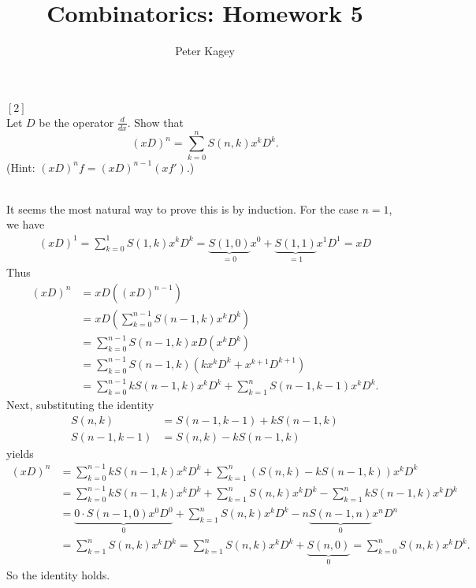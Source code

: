 \documentclass{article}
\newenvironment{problem}[2][Problem]{\begin{trivlist}
\item[\hskip \labelsep {\bfseries #1}\hskip \labelsep {\bfseries #2.}]}{\end{trivlist}}
\newenvironment{solution}[1][Solution.]{\begin{trivlist}
\item[\hskip \labelsep {\bfseries #1}]}{\end{trivlist}}
\begin{document}
\title{Combinatorics: Homework 5}
\author{Peter Kagey}

\maketitle

\begin{problem}{47 (a)} $[2]$ \\
  Let $D$ be the operator $\frac{d}{dx}$. Show that \[
    (xD)^n = \sum_{k=0}^n S(n, k) x^kD^k.
  \]
  (Hint: $(xD)^nf = (xD)^{n-1}(xf')$.)
\end{problem}

\begin{solution} \text{} \\
  It seems the most natural way to prove this is by induction. For the case
  $n = 1$, we have \begin{align*}
    (xD)^1 = \sum_{k=0}^1 S(1, k) x^kD^k
           = \underbrace{S(1, 0)}_{=0} x^0 + \underbrace{S(1, 1)}_{=1} x^1D^1
           = xD
  \end{align*}
  Thus \begin{align*}
    (xD)^{n}
    &= xD((xD)^{n-1}) \\
    &= xD\!\!\left(\sum_{k=0}^{n-1} S(n - 1, k) x^kD^k\right) \\
    &= \sum_{k=0}^{n-1} S(n - 1, k) xD(x^kD^k) \\
    &= \sum_{k=0}^{n-1} S(n - 1, k) (kx^kD^k + x^{k+1}D^{k+1}) \\
    &= \sum_{k=0}^{n-1} kS(n - 1, k) x^kD^k + \sum_{k=1}^{n} S(n - 1, k - 1)x^{k}D^{k}.
  \end{align*}
  Next, substituting the identity \begin{align*}
    S(n, k) &= S(n - 1, k - 1) + kS(n - 1, k) \\
    S(n - 1, k - 1) &= S(n, k) - kS(n - 1, k)
  \end{align*} yields
  \begin{align*}
    (xD)^{n}
    &= \sum_{k=0}^{n-1} kS(n - 1, k) x^kD^k + \sum_{k=1}^{n} (S(n, k) - kS(n - 1, k))x^{k}D^{k} \\
    &= \sum_{k=0}^{n-1} kS(n - 1, k) x^kD^k + \sum_{k=1}^{n} S(n, k)x^{k}D^{k} - \sum_{k=1}^{n} kS(n - 1, k)x^{k}D^{k} \\
    &= \underbrace{0 \cdot S(n - 1, 0) x^0D^0}_{0}
      + \sum_{k=1}^{n} S(n, k)x^{k}D^{k}
      - n\underbrace{S(n - 1, n)}_{0}x^{n}D^{n} \\
    &= \sum_{k=1}^{n} S(n, k)x^{k}D^{k}
    = \sum_{k=1}^{n} S(n, k)x^{k}D^{k} + \underbrace{S(n, 0)}_{0}
    = \sum_{k=0}^{n} S(n, k)x^{k}D^{k}.
  \end{align*}
  So the identity holds.
\end{solution}
\end{document}
